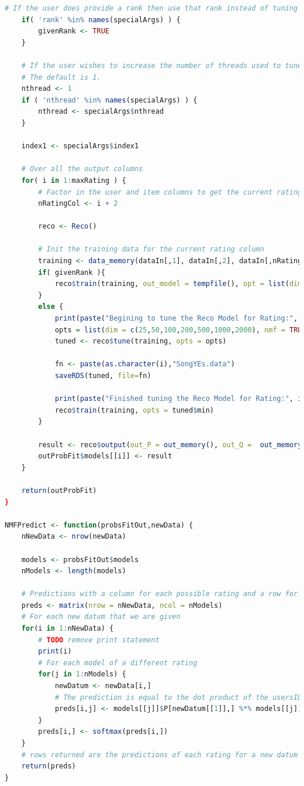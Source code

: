 \documentclass{article}
\begin{document}
\begin{lstlisting}[language=R]
	# If the user does provide a rank then use that rank instead of tuning for a rank.
	if( 'rank' %in% names(specialArgs) ) {
		givenRank <- TRUE
	}

	# If the user wishes to increase the number of threads used to tune then they can be modified here.
	# The default is 1.
	nthread <- 1
	if ( 'nthread' %in% names(specialArgs) ) {
		nthread <- specialArgs$nthread
	}

	index1 <- specialArgs$index1

	# Over all the output columns
	for( i in 1:maxRating ) {
		# Factor in the user and item columns to get the current rating column
		nRatingCol <- i + 2
		
		reco <- Reco()

		# Init the training data for the current rating column
		training <- data_memory(dataIn[,1], dataIn[,2], dataIn[,nRatingCol], index1 = index1)
		if( givenRank ){
			reco$train(training, out_model = tempfile(), opt = list(dim = rank, nmf=TRUE, nthread = nthread))
		}
		else {
			print(paste("Begining to tune the Reco Model for Rating:", i))
			opts = list(dim = c(25,50,100,200,500,1000,2000), nmf = TRUE, costp_l1 = 0, costp_l2 = 0, costq_l1 = 0, costq_l2 = 0, lrate = 0.1, nmf = TRUE, nthread = nthread, progress = TRUE, verbose = TRUE)
			tuned <- reco$tune(training, opts = opts)

			fn <- paste(as.character(i),"SongYEs.data")
			saveRDS(tuned, file=fn)

			print(paste("Finished tuning the Reco Model for Rating:", i))
			reco$train(training, opts = tuned$min)
		}
			  	
		result <- reco$output(out_P = out_memory(), out_Q =  out_memory())
		outProbFit$models[[i]] <- result
	}

	return(outProbFit)
}

NMFPredict <- function(probsFitOut,newData) {
	nNewData <- nrow(newData)
	
	models <- probsFitOut$models
	nModels <- length(models)

	# Predictions with a column for each possible rating and a row for each new data input.
	preds <- matrix(nrow = nNewData, ncol = nModels)
	# For each new datum that we are given
	for(i in 1:nNewData) {
		# TODO remove print statement
		print(i)
		# For each model of a different rating
		for(j in 1:nModels) {
			newDatum <- newData[i,]
			# The prediction is equal to the dot product of the usersID row in P and the itemID col in Q 
			preds[i,j] <- models[[j]]$P[newDatum[[1]],] %*% models[[j]]$Q[newDatum[[2]],]
		}
		preds[i,] <- softmax(preds[i,])
	}
	# rows returned are the predictions of each rating for a new datum
	return(preds)
}


\end{lstlisting}
\end{document}
